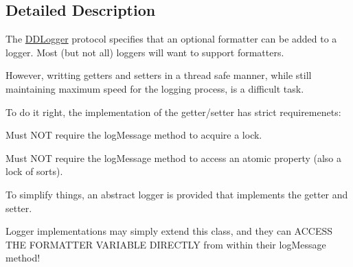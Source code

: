 \subsection{Detailed Description}
The \hyperlink{protocol_d_d_logger-p}{D\-D\-Logger} protocol specifies that an optional formatter can be added to a logger. Most (but not all) loggers will want to support formatters.

However, writting getters and setters in a thread safe manner, while still maintaining maximum speed for the logging process, is a difficult task.

To do it right, the implementation of the getter/setter has strict requiremenets\-:
\begin{DoxyItemize}
\item Must N\-O\-T require the log\-Message method to acquire a lock.
\item Must N\-O\-T require the log\-Message method to access an atomic property (also a lock of sorts).
\end{DoxyItemize}

To simplify things, an abstract logger is provided that implements the getter and setter.

Logger implementations may simply extend this class, and they can A\-C\-C\-E\-S\-S T\-H\-E F\-O\-R\-M\-A\-T\-T\-E\-R V\-A\-R\-I\-A\-B\-L\-E D\-I\-R\-E\-C\-T\-L\-Y from within their log\-Message method! 

